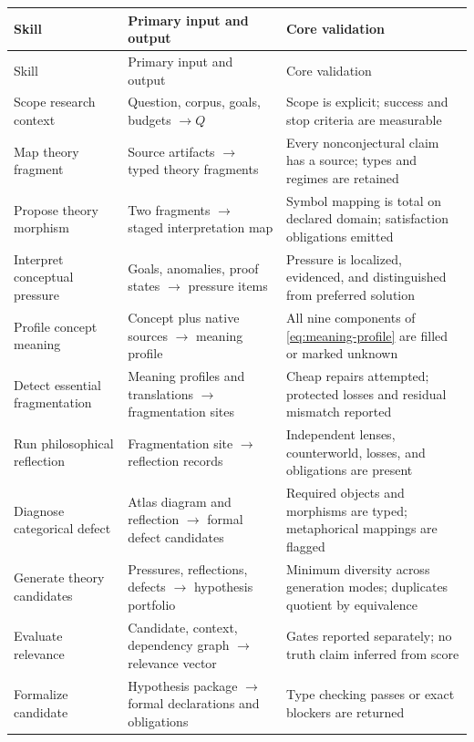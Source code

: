 \documentclass[11pt]{article}
\begin{document}
\begin{longtable}{@{}
>{\raggedright\arraybackslash}p{}
>{\raggedright\arraybackslash}p{}
>{\raggedright\arraybackslash}p{}@{}}
\toprule
Skill & Primary input and output & Core validation \\
\midrule
\endfirsthead
\toprule
Skill & Primary input and output & Core validation \\
\midrule
\endhead
Scope research context & Question, corpus, goals, budgets \(\to Q\) & Scope is explicit; success and stop criteria are measurable \\
Map theory fragment & Source artifacts \(\to\) typed theory fragments & Every nonconjectural claim has a source; types and regimes are retained \\
Propose theory morphism & Two fragments \(\to\) staged interpretation map & Symbol mapping is total on declared domain; satisfaction obligations emitted \\
Interpret conceptual pressure & Goals, anomalies, proof states \(\to\) pressure items & Pressure is localized, evidenced, and distinguished from preferred solution \\
Profile concept meaning & Concept plus native sources \(\to\) meaning profile & All nine components of \eqref{eq:meaning-profile} are filled or marked unknown \\
Detect essential fragmentation & Meaning profiles and translations \(\to\) fragmentation sites & Cheap repairs attempted; protected losses and residual mismatch reported \\
Run philosophical reflection & Fragmentation site \(\to\) reflection records & Independent lenses, counterworld, losses, and obligations are present \\
Diagnose categorical defect & Atlas diagram and reflection \(\to\) formal defect candidates & Required objects and morphisms are typed; metaphorical mappings are flagged \\
Generate theory candidates & Pressures, reflections, defects \(\to\) hypothesis portfolio & Minimum diversity across generation modes; duplicates quotient by equivalence \\
Evaluate relevance & Candidate, context, dependency graph \(\to\) relevance vector & Gates reported separately; no truth claim inferred from score \\
Formalize candidate & Hypothesis package \(\to\) formal declarations and obligations & Type checking passes or exact blockers are returned \\

\end{longtable}
\end{document}

